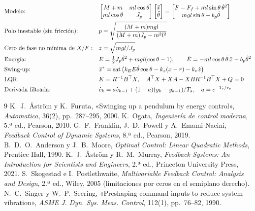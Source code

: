 \begin{align*}
&\text{Modelo:} && \begin{bmatrix} M+m & ml\cos\theta\\ ml\cos\theta & J_p\end{bmatrix}\begin{bmatrix}\ddot{x}\\ \ddot{\theta}\end{bmatrix}=\begin{bmatrix} F - F_f + ml\sin\theta\,\dot{\theta}^2\\ mgl\sin\theta - b_p\dot{\theta}\end{bmatrix}\\
&\text{Polo inestable (sin fricción):} && p=\sqrt{\frac{(M+m)mgl}{(M+m)J_p-m^2l^2}}\\
&\text{Cero de fase no mínima de } X/F: && z=\sqrt{mgl/J_p}\\
&\text{Energía:} && E=\tfrac12J_p\dot{\theta}^2+mgl(\cos\theta-1),\qquad \dot E=-ml\cos\theta\,\dot{\theta}\,\ddot{x}-b_p\dot{\theta}^2\\
&\text{Swing-up:} && \ddot{x}^\ast=\operatorname{sat}\big(k_EE\dot{\theta}\cos\theta-k_x(x-r)-k_v\dot{x}\big)\\
&\text{LQR:} && K=R^{-1}B^\top X,\quad A^\top X+XA-XBR^{-1}B^\top X+Q=0\\
&\text{Derivada filtrada:} && \hat v_k=a\hat v_{k-1}+(1-a)(y_k-y_{k-1})/T_s,\quad a=e^{-T_s/\tau_v}
\end{align*}

\begin{thebibliography}{9}
 K.~J.~Åström y K.~Furuta, «Swinging up a pendulum by energy control», \emph{Automatica}, 36(2), pp.~287--295, 2000.
 K.~Ogata, \emph{Ingeniería de control moderna}, 5.ª ed., Pearson, 2010.
 G.~F.~Franklin, J.~D.~Powell y A.~Emami-Naeini, \emph{Feedback Control of Dynamic Systems}, 8.ª ed., Pearson, 2019.
 B.~D.~O.~Anderson y J.~B.~Moore, \emph{Optimal Control: Linear Quadratic Methods}, Prentice Hall, 1990.
 K.~J.~Åström y R.~M.~Murray, \emph{Feedback Systems: An Introduction for Scientists and Engineers}, 2.ª ed., Princeton University Press, 2021.
 S.~Skogestad e I.~Postlethwaite, \emph{Multivariable Feedback Control: Analysis and Design}, 2.ª ed., Wiley, 2005 (limitaciones por ceros en el semiplano derecho).
 N.~C.~Singer y W.~P.~Seering, «Preshaping command inputs to reduce system vibration», \emph{ASME J. Dyn. Sys. Meas. Control}, 112(1), pp.~76--82, 1990.
\end{thebibliography}
